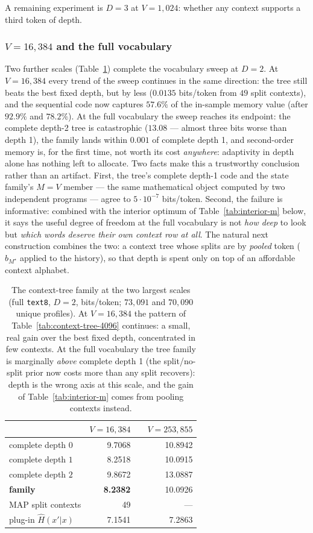 \documentclass[11pt]{article}
\begin{document}
A remaining experiment is $D=3$ at $V=1{,}024$: whether any context
supports a third token of depth.

\subsubsection*{$V=16{,}384$ and the full vocabulary}
Two further scales (Table~\ref{tab:context-tree-large}) complete the
vocabulary sweep at
$D=2$.  At $V=16{,}384$ every trend of the sweep continues in the same
direction: the tree still beats the best fixed depth, but by less
($0.0135$ bits/token from $49$ split contexts), and the sequential
code now captures $57.6\%$ of the in-sample memory value (after
$92.9\%$ and $78.2\%$).  At the full vocabulary the sweep reaches its
endpoint: the complete depth-2 tree is catastrophic ($13.08$ ---
almost three bits worse than depth 1), the family lands within
$0.001$ of complete depth 1, and second-order memory is, for the
first time, not worth its cost \emph{anywhere}: adaptivity in depth
alone has nothing left to allocate.  Two facts make this a
trustworthy conclusion rather than an artifact.  First, the tree's
complete depth-1 code and the state family's $M{=}V$ member --- the
same mathematical object computed by two independent programs ---
agree to $5\cdot 10^{-7}$ bits/token.  Second, the failure is
informative: combined with the interior optimum of
Table~\ref{tab:interior-m} below, it says the useful degree of freedom
at the full vocabulary is not \emph{how deep} to look but \emph{which
words deserve their own context row at all}.  The natural next
construction combines the two: a context tree whose splits are by
\emph{pooled} token ($b_{M^\star}$ applied to the history), so that
depth is spent only on top of an affordable context alphabet.

\begin{table}[ht]
\centering
\begin{tabular}{lrcr}
\toprule
 & $V=16{,}384$ & & $V=253{,}855$ \\
\midrule
complete depth $0$      & 9.7068  & & 10.8942 \\
complete depth $1$      & 8.2518  & & 10.0915 \\
complete depth $2$      & 9.8672  & & 13.0887 \\
\textbf{family}         & \textbf{8.2382} & & 10.0926 \\
MAP split contexts      & 49      & & --- \\
plug-in $\hat H(x'|x)$  & 7.1541  & & 7.2863 \\
\bottomrule
\end{tabular}
\caption{The context-tree family at the two largest scales (full
  \texttt{text8}, $D=2$, bits/token; $73{,}091$ and $70{,}090$ unique
  profiles).  At $V=16{,}384$ the pattern of
  Table~\ref{tab:context-tree-4096} continues: a small, real gain over
  the best fixed depth, concentrated in few contexts.  At the full
  vocabulary the tree family is marginally \emph{above} complete
  depth 1 (the split/no-split prior now costs more than any split
  recovers): depth is the wrong axis at this scale, and the gain of
  Table~\ref{tab:interior-m} comes from pooling contexts instead.}
\label{tab:context-tree-large}
\end{table}
\end{document}
